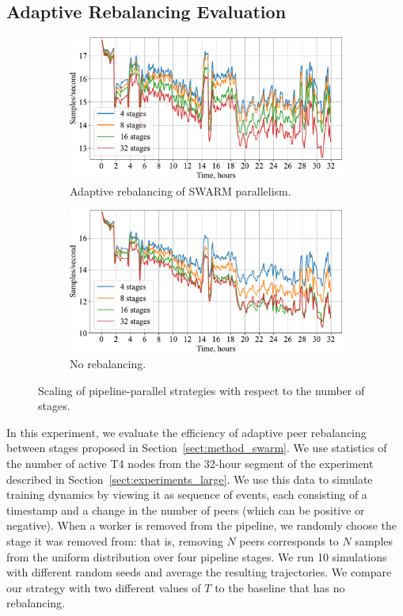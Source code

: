 \subsection{Adaptive Rebalancing Evaluation}


\begin{figure}[h!]
\begin{subfigure}{0.5\textwidth}
    \centering
    \includegraphics[width=0.97\linewidth]{resources/rebalancing_stages.pdf}
    \caption{Adaptive rebalancing of SWARM parallelism.}
    \label{fig:rebalancing_stages}
\end{subfigure}%
\begin{subfigure}{0.5\textwidth}
    \centering
    \includegraphics[width=0.97\linewidth]{resources/rebalancing_stages_baseline.pdf}
    \caption{No rebalancing.}
    \label{fig:rebalancing_stages_baseline}
\end{subfigure}
\caption{Scaling of pipeline-parallel strategies with respect to the number of stages.}
\label{fig:rebalancing_stages_all}
\end{figure}

\label{sect:experiments_adaptive}
In this experiment, we evaluate the efficiency of adaptive peer rebalancing between stages proposed in Section~\ref{sect:method_swarm}. 
We use statistics of the number of active T4 nodes from the 32-hour segment of the experiment described in Section~\ref{sect:experiments_large}. 
We use this data to simulate training dynamics by viewing it as sequence of events, each consisting of a timestamp and a change in the number of peers (which can be positive or negative). 
When a worker is removed from the pipeline, we randomly choose the stage it was removed from: that is, removing $N$ peers corresponds to $N$ samples from the uniform distribution over four pipeline stages. 
We run 10 simulations with different random seeds and average the resulting trajectories.
We compare our strategy with two different values of $T$ to the baseline that has no rebalancing.

